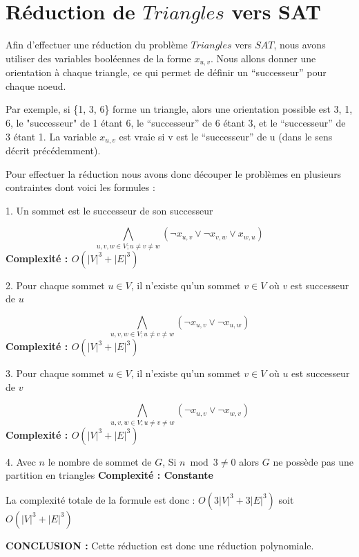 \documentclass{article}
\begin{document}
\section{Réduction de $Triangles$ vers SAT}

Afin d'effectuer une réduction du problème $Triangles$ vers $SAT$, nous avons utiliser des variables booléennes de la forme $x_{u,v}$.
Nous allons donner une orientation à chaque triangle, ce qui permet de définir un “successeur” pour chaque noeud. 

Par exemple, si \{1, 3, 6\} forme un triangle, alors une orientation possible est 3, 1, 6, le "successeur" de 1 étant 6, le “successeur” de 6 étant 3, et le “successeur” de 3 étant 1. 
La variable $x_{u,v}$ est vraie si v est le “successeur” de u (dans le sens décrit précédemment).

Pour effectuer la réduction nous avons donc découper le problèmes en plusieurs contraintes dont voici les formules :

\bigbreak

1. Un sommet est le successeur de son successeur 

$$ \bigwedge\limits_{u,v,w \in V; u \ne v \ne w} (\neg x_{u,v} \vee \neg x_{v,w} \vee x_{w,u}) $$
\textbf{Complexité : $O(|V|^3 + |E|^3)$}
\bigbreak

2. Pour chaque sommet $u \in V$, il n'existe qu'un sommet $v \in V$ où $v$ est successeur de $u$

$$ \bigwedge\limits_{u,v,w \in V; u \ne v \ne w} (\neg x_{u,v} \vee \neg x_{u,w}) $$
\textbf{Complexité : $O(|V|^3 + |E|^3)$}
\bigbreak

3. Pour chaque sommet $u \in V$, il n'existe qu'un sommet $v \in V$ où $u$ est successeur de $v$

$$ \bigwedge\limits_{u,v,w \in V; u \ne v \ne w} (\neg x_{u,v} \vee \neg x_{w,v}) $$
\textbf{Complexité : $O(|V|^3 + |E|^3)$}
\bigbreak

4. Avec $n$ le nombre de sommet de $G$, Si $n \bmod 3 \ne 0$ alors $G$ ne possède pas une partition en triangles 
\smallbreak
\noindent\textbf{Complexité : Constante}


\bigbreak
\noindent La complexité totale de la formule est donc :  \textbf{$O(3|V|^3 + 3|E|^3)$} soit \textbf{$O(|V|^3 + |E|^3)$}

\smallbreak
\noindent\textbf{CONCLUSION :} Cette réduction est donc une réduction polynomiale.
\end{document}
